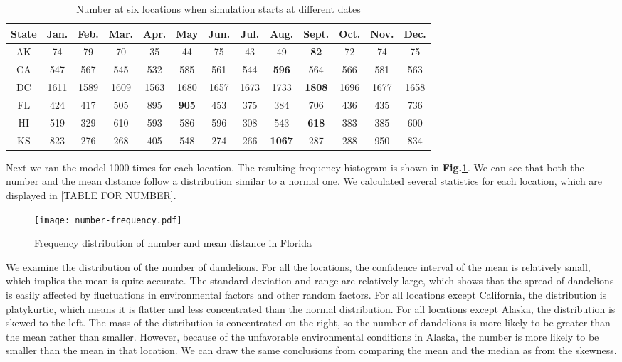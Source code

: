\documentclass[12pt]{article}
\begin{document}
			{
				\fontsize{10}{14}\selectfont
				{
					\begin{longtable}{ccccccccccccc}
						\caption{Number at six locations when simulation starts at different dates}
						\label{tb:start}\\
						\toprule
						State&Jan.&Feb.&Mar.&Apr.&May&Jun.&Jul.&Aug.&Sept.&Oct.&Nov.&Dec.\\
						\toprule
						AK&74&79&70&35&44&75&43&49&\color{blue}\textbf{82}&72&74&75\\
						CA&547&567&545&532&585&561&544&\color{blue}\textbf{596}&564&566&581&563\\
						DC&1611&1589&1609&1563&1680&1657&1673&1733&\color{blue}\textbf{1808}&1696&1677&1658\\
						FL&424&417&505&895&\color{blue}\textbf{905}&453&375&384&706&436&435&736\\
						HI&519&329&610&593&586&596&308&543&\color{blue}\textbf{618}&383&385&600\\
						KS&823&276&268&405&548&274&266&\color{blue}\textbf{1067}&287&288&950&834\\
						\bottomrule
					\end{longtable}
				}
			}
			
			Next we ran the model 1000 times for each location.  The resulting frequency histogram is shown in \textbf{Fig.\ref{fig:freqDand}}.  We can see that both the number and the mean distance follow a distribution similar to a normal one.  We calculated several statistics for each location, which are displayed in [TABLE FOR NUMBER].
			
			\begin{figure}
				\centering
				\texttt{[image: number-frequency.pdf]}
				\caption{Frequency distribution of number and mean distance in Florida}
				\label{fig:freqDand}
			\end{figure}
			
			We examine the distribution of the number of dandelions.  For all the locations, the confidence interval of the mean is relatively small, which implies the mean is quite accurate.  The standard deviation and range are relatively large, which shows that the spread of dandelions is easily affected by fluctuations in environmental factors and other random factors.  For all locations except California, the distribution is platykurtic, which means it is flatter and less concentrated than the normal distribution.  For all locations except Alaska, the distribution is skewed to the left.  The mass of the distribution is concentrated on the right, so the number of dandelions is more likely to be greater than the mean rather than smaller.  However, because of the unfavorable environmental conditions in Alaska, the number is more likely to be smaller than the mean in that location.  We can draw the same conclusions from comparing the mean and the median as from the skewness.
			
\end{document}
